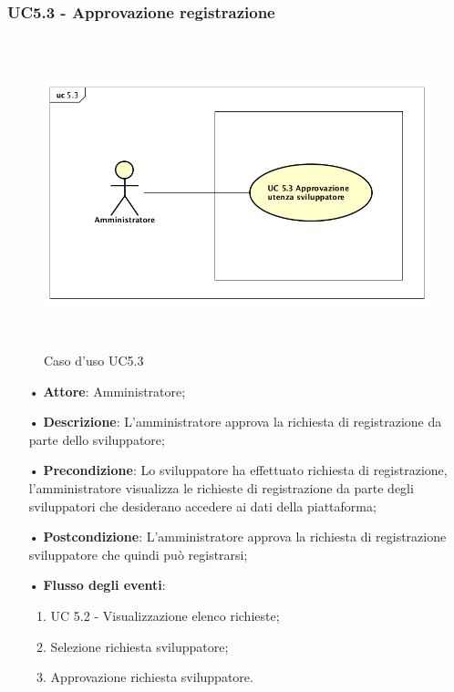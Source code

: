 \subsubsection{UC5.3 - Approvazione registrazione}
\begin{figure}[H]
\centering
\includegraphics[width=17cm, height=9cm]{img/UC53.png} 
\caption{Caso d'uso UC5.3}
\end{figure}

\begin{itemize}
\item[•] \textbf{Attore}: Amministratore;

\item[•] \textbf{Descrizione}: L'amministratore approva la richiesta di registrazione da parte dello sviluppatore;

\item[•] \textbf{Precondizione}: Lo sviluppatore ha effettuato richiesta di registrazione, l'amministratore visualizza le richieste di registrazione da parte degli sviluppatori che desiderano accedere ai dati della piattaforma;

\item[•] \textbf{Postcondizione}: L'amministratore approva la richiesta di registrazione sviluppatore che quindi può registrarsi;

\item[•] \textbf{Flusso degli eventi}:

\begin{enumerate}

\item UC 5.2 - Visualizzazione elenco richieste;

\item Selezione richiesta sviluppatore;

\item Approvazione richiesta sviluppatore.

\end{enumerate}

\end{itemize}


